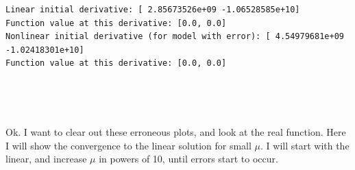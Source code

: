 \documentclass[11pt]{article}
\begin{document}
    \begin{Verbatim}[commandchars=\\\{\}]
Linear initial derivative: [ 2.85673526e+09 -1.06528585e+10]
Function value at this derivative: [0.0, 0.0]
Nonlinear initial derivative (for model with error): [ 4.54979681e+09
-1.02418301e+10]
Function value at this derivative: [0.0, 0.0]
    \end{Verbatim}

    \begin{center}
    \end{center}
    { \hspace*{\fill} \\}
    
    \begin{center}
    \end{center}
    { \hspace*{\fill} \\}
    
    Ok. I want to clear out these erroneous plots, and look at the real
function. Here I will show the convergence to the linear solution for
small \(\mu\). I will start with the linear, and increase \(\mu\) in
powers of 10, until errors start to occur.
\end{document}
